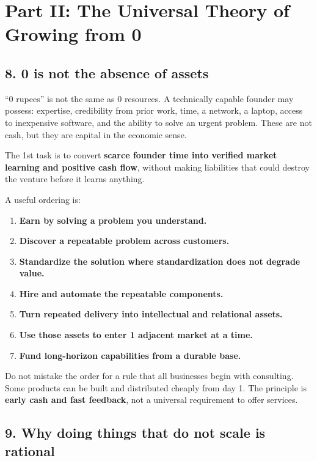 
\section*{Part II: The Universal Theory of Growing from 0}

\subsection{8. 0 is not the absence of assets}

``0 rupees'' is not the same as 0 resources. A technically capable founder may possess: expertise, credibility from prior work, time, a network, a laptop, access to inexpensive software, and the ability to solve an urgent problem. These are not cash, but they are capital in the economic sense.

The 1st task is to convert \textbf{scarce founder time into verified market learning and positive cash flow}, without making liabilities that could destroy the venture before it learns anything.

A useful ordering is:

\begin{enumerate}[leftmargin=*,itemsep=1.5pt]
  \item \textbf{Earn by solving a problem you understand.}
  \item \textbf{Discover a repeatable problem across customers.}
  \item \textbf{Standardize the solution where standardization does not degrade value.}
  \item \textbf{Hire and automate the repeatable components.}
  \item \textbf{Turn repeated delivery into intellectual and relational assets.}
  \item \textbf{Use those assets to enter 1 adjacent market at a time.}
  \item \textbf{Fund long-horizon capabilities from a durable base.}
\end{enumerate}

Do not mistake the order for a rule that all businesses begin with consulting. Some products can be built and distributed cheaply from day 1. The principle is \textbf{early cash and fast feedback}, not a universal requirement to offer services.

\subsection{9. Why doing things that do not scale is rational}

